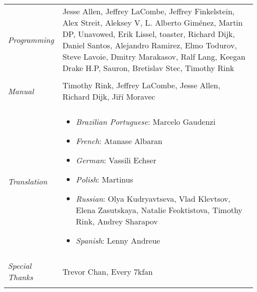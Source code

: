\begin{tabular}{p{1in} p{3in}}
    \textit{Programming} & Jesse Allen, Jeffrey LaCombe, Jeffrey Finkelstein, Alex Streit, Aleksey V, L. Alberto Giménez, Martin DP, Unavowed, Erik Lissel, toaster, Richard Dijk, Daniel Santos, Alejandro Ramirez, Elmo Todurov, Steve Lavoie, Dmitry Marakasov, Ralf Lang, Keegan Drake H.P, Sauron, Bretislav Stec, Timothy Rink \\ \\
    \textit{Manual} & Timothy Rink, Jeffrey LaCombe, Jesse Allen, Richard Dijk, Jiří Moravec \\ \\
    \textit{Translation} & 
        \begin{itemize}
            \item \textit{Brazilian Portuguese}: Marcelo Gaudenzi
            \item \textit{French}: Atanase Albaran
            \item \textit{German}: Vassili Echser
            \item \textit{Polish}: Martinus
            \item \textit{Russian}: Olya Kudryavtseva, Vlad Klevtsov, Elena Zasutskaya, Natalie Feoktistova, Timothy Rink, Andrey Sharapov
            \item \textit{Spanish}: Lenny Andreue
        \end{itemize} \\ \\
    \textit{Special Thanks} & Trevor Chan, Every 7kfan \\ \\
\end{tabular}